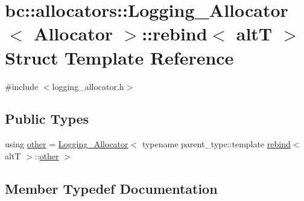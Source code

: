 \hypertarget{structbc_1_1allocators_1_1Logging__Allocator_1_1rebind}{}\section{bc\+:\+:allocators\+:\+:Logging\+\_\+\+Allocator$<$ Allocator $>$\+:\+:rebind$<$ altT $>$ Struct Template Reference}
\label{structbc_1_1allocators_1_1Logging__Allocator_1_1rebind}


{\ttfamily \#include $<$logging\+\_\+allocator.\+h$>$}

\subsection*{Public Types}
\begin{DoxyCompactItemize}
\item 
using \hyperlink{structbc_1_1allocators_1_1Logging__Allocator_1_1rebind_ad2959439fcb1aa3d20874f1f3a205828}{other} = \hyperlink{structbc_1_1allocators_1_1Logging__Allocator}{Logging\+\_\+\+Allocator}$<$ typename parent\+\_\+type\+::template \hyperlink{structbc_1_1allocators_1_1Logging__Allocator_1_1rebind}{rebind}$<$ altT $>$\+::\hyperlink{structbc_1_1allocators_1_1Logging__Allocator_1_1rebind_ad2959439fcb1aa3d20874f1f3a205828}{other} $>$
\end{DoxyCompactItemize}


\subsection{Member Typedef Documentation}
\mbox{\label{structbc_1_1allocators_1_1Logging__Allocator_1_1rebind_ad2959439fcb1aa3d20874f1f3a205828}} 
